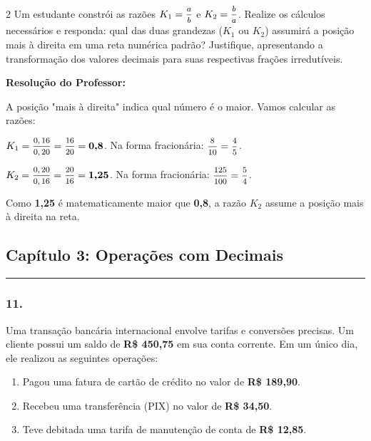 \begin{multicols*}{2}
Um estudante constrói as razões $ K_1 = \mfrac{a}{b} $ e $ K_2 = \mfrac{b}{a} $. Realize os cálculos necessários e responda: qual das duas grandezas ($ K_1 $ ou $ K_2 $) assumirá a posição mais à direita em uma reta numérica padrão? Justifique, apresentando a transformação dos valores decimais para suas respectivas frações irredutíveis.

\ifgabarito
    \begin{tcolorbox}[colback=CorTitUm!5, colframe=CorTitUm, boxrule=1pt, arc=4pt, left=6pt, right=6pt, top=6pt, bottom=6pt]
    \small\textbf{\textcolor{CorTitUm}{Resolução do Professor:}}\par\vspace{0.1cm}
    \color{CinzaEscuro}
    A posição "mais à direita" indica qual número é o maior. Vamos calcular as razões:
    
    $K_1 = \mfrac{0,16}{0,20} = \mfrac{16}{20} = \textbf{0,8}$. Na forma fracionária: $\mfrac{8}{10} = \mfrac{4}{5}$.
    
    $K_2 = \mfrac{0,20}{0,16} = \mfrac{20}{16} = \textbf{1,25}$. Na forma fracionária: $\mfrac{125}{100} = \mfrac{5}{4}$.
    
    Como \textbf{1,25} é matematicamente maior que \textbf{0,8}, a razão \textbf{$K_2$} assume a posição mais à direita na reta.
    \end{tcolorbox}
\fi

\par\vspace{\espacoQuestao}

\subsection*{Capítulo 3: Operações com Decimais}
\vspace{-0.2cm}\noindent\rule{\linewidth}{1.5pt} 
\par\vspace{\espacoPosTitulo}
\subsubsection*{11.} Uma transação bancária internacional envolve tarifas e conversões precisas. Um cliente possui um saldo de \textbf{R\$ 450,75} em sua conta corrente. Em um único dia, ele realizou as seguintes operações:
\begin{enumerate}[label=\arabic*., itemsep=\espacoAlt]
    \item Pagou uma fatura de cartão de crédito no valor de \textbf{R\$ 189,90}.
    \item Recebeu uma transferência (PIX) no valor de \textbf{R\$ 34,50}.
    \item Teve debitada uma tarifa de manutenção de conta de \textbf{R\$ 12,85}.
\end{enumerate}


\end{multicols*}
